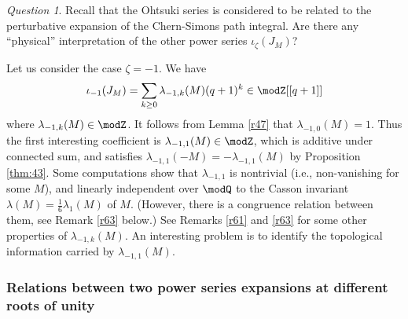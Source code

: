 \documentclass{amsart}
\numberwithin{equation}{section}
\numberwithin{figure}{section}
\theoremstyle{plain}
\theoremstyle{definition}
\theoremstyle{remark}
\newtheorem{question}[theorem]{Question}
\begin{document}
\begin{question}
  \label{r41}
  Recall that the Ohtsuki series is considered to be related to the
  perturbative expansion of the Chern-Simons path integral.  Are there
  any ``physical'' interpretation of the other power series
  $\iota _\zeta (J_M)$?
\end{question}

Let us consider the case $\zeta =-1$.  We have
\begin{equation}
  \label{e75}
  \iota _{-1}(J_M)=\sum_{k\ge 0}\lambda _{-1,k}(M)(q+1)^k
  \in \modZ [[q+1]]
\end{equation}
where $\lambda _{-1,k}(M)\in \modZ $.  It follows from Lemma \ref{r47} that
$\lambda _{-1,0}(M)=1$.  Thus the first interesting coefficient is
$\lambda _{-1,1}(M)\in \modZ $, which is additive under connected sum, and
satisfies $\lambda _{-1,1}(-M)=-\lambda _{-1,1}(M)$ by Proposition \ref{thm:43}.
Some computations show that $\lambda _{-1,1}$ is nontrivial (i.e.,
non-vanishing for some $M$), and linearly independent over $\modQ $ to the
Casson invariant $\lambda (M)=\frac{1}{6}\lambda _1(M)$ of $M$.  (However, there
is a congruence relation between them, see Remark \ref{r63} below.)
See Remarks \ref{r61} and \ref{r63} for some other properties of
$\lambda _{-1,k}(M)$.  An interesting problem is to identify the topological
information carried by $\lambda _{-1,1}(M)$.

\subsubsection{Relations between two power series expansions at
  different roots of unity}
\label{sec:relat-betw-two}
\end{document}
